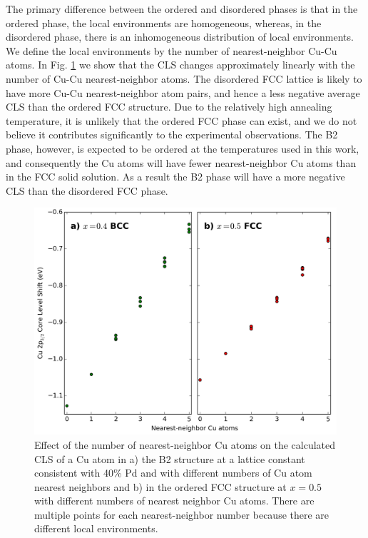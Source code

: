 \documentclass[number, sort&compress, review, 12pt]{elsarticle}
\begin{document}
The primary difference between the ordered and disordered phases is that in the ordered phase, the local environments are homogeneous, whereas, in the disordered phase, there is an inhomogeneous distribution of local environments. We define the local environments by the number of nearest-neighbor Cu-Cu atoms. In Fig. \ref{fig-cls-nimp} we show that the CLS changes approximately linearly with the number of Cu-Cu nearest-neighbor atoms. The disordered FCC lattice is likely to have more Cu-Cu nearest-neighbor atom pairs, and hence a less negative average CLS than the ordered FCC structure. Due to the relatively high annealing temperature, it is unlikely that the ordered FCC phase can exist, and we do not believe it contributes significantly to the experimental observations. The B2 phase, however, is expected to be ordered at the temperatures used in this work, and consequently the Cu atoms will have fewer nearest-neighbor Cu atoms than in the FCC solid solution. As a result the B2 phase will have a  more negative CLS than the disordered FCC phase.

\begin{figure}[H]
\centering
\includegraphics[width=6in]{./images/impurity.png}
\caption{\label{fig-cls-nimp}Effect of the number of nearest-neighbor Cu atoms on the calculated CLS of a Cu atom in a) the B2 structure at a lattice constant consistent with 40\% Pd and with different numbers of Cu atom nearest neighbors and b) in the ordered FCC structure at $x=0.5$ with different numbers of nearest neighbor Cu atoms. There are multiple points for each nearest-neighbor number because there are different local environments.}
\end{figure}
\end{document}
